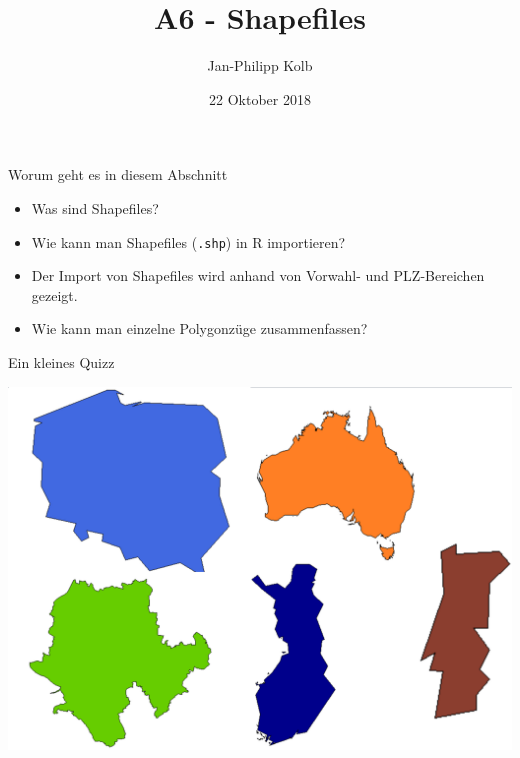 \documentclass[ignorenonframetext,]{beamer}
\title{A6 - Shapefiles}
\author{Jan-Philipp Kolb}
\date{22 Oktober 2018}
\providecommand{\tightlist}{%
  \setlength{\itemsep}{0pt}\setlength{\parskip}{0pt}}
\begin{document}
\frame{\titlepage}

\begin{frame}[fragile]{Worum geht es in diesem Abschnitt}
\protect\hypertarget{worum-geht-es-in-diesem-abschnitt}{}

\begin{itemize}
\tightlist
\item
  Was sind Shapefiles?
\item
  Wie kann man Shapefiles (\texttt{.shp}) in R importieren?
\item
  Der Import von Shapefiles wird anhand von Vorwahl- und PLZ-Bereichen
  gezeigt.
\item
  Wie kann man einzelne Polygonzüge zusammenfassen?
\end{itemize}

\end{frame}

\begin{frame}{Ein kleines Quizz}
\protect\hypertarget{ein-kleines-quizz}{}

\includegraphics{figure/quizz.PNG}

\end{frame}
\end{document}
